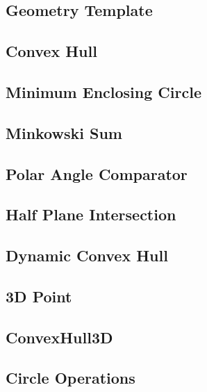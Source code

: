 \documentclass{article}
\begin{document}
\subsection{Geometry Template}


\subsection{Convex Hull}


\subsection{Minimum Enclosing Circle}


\subsection{Minkowski Sum}


\subsection{Polar Angle Comparator}


\subsection{Half Plane Intersection}


\subsection{Dynamic Convex Hull}


\subsection{3D Point}


\subsection{ConvexHull3D}


\subsection{Circle Operations}

\end{document}
